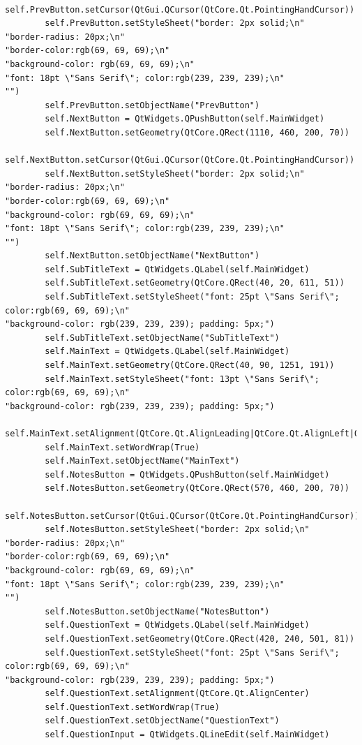 \documentclass{article}
\begin{document}
\begin{lstlisting}
        self.PrevButton.setCursor(QtGui.QCursor(QtCore.Qt.PointingHandCursor))
        self.PrevButton.setStyleSheet("border: 2px solid;\n"
"border-radius: 20px;\n"
"border-color:rgb(69, 69, 69);\n"
"background-color: rgb(69, 69, 69);\n"
"font: 18pt \"Sans Serif\"; color:rgb(239, 239, 239);\n"
"")
        self.PrevButton.setObjectName("PrevButton")
        self.NextButton = QtWidgets.QPushButton(self.MainWidget)
        self.NextButton.setGeometry(QtCore.QRect(1110, 460, 200, 70))
        self.NextButton.setCursor(QtGui.QCursor(QtCore.Qt.PointingHandCursor))
        self.NextButton.setStyleSheet("border: 2px solid;\n"
"border-radius: 20px;\n"
"border-color:rgb(69, 69, 69);\n"
"background-color: rgb(69, 69, 69);\n"
"font: 18pt \"Sans Serif\"; color:rgb(239, 239, 239);\n"
"")
        self.NextButton.setObjectName("NextButton")
        self.SubTitleText = QtWidgets.QLabel(self.MainWidget)
        self.SubTitleText.setGeometry(QtCore.QRect(40, 20, 611, 51))
        self.SubTitleText.setStyleSheet("font: 25pt \"Sans Serif\"; color:rgb(69, 69, 69);\n"
"background-color: rgb(239, 239, 239); padding: 5px;")
        self.SubTitleText.setObjectName("SubTitleText")
        self.MainText = QtWidgets.QLabel(self.MainWidget)
        self.MainText.setGeometry(QtCore.QRect(40, 90, 1251, 191))
        self.MainText.setStyleSheet("font: 13pt \"Sans Serif\"; color:rgb(69, 69, 69);\n"
"background-color: rgb(239, 239, 239); padding: 5px;")
        self.MainText.setAlignment(QtCore.Qt.AlignLeading|QtCore.Qt.AlignLeft|QtCore.Qt.AlignTop)
        self.MainText.setWordWrap(True)
        self.MainText.setObjectName("MainText")
        self.NotesButton = QtWidgets.QPushButton(self.MainWidget)
        self.NotesButton.setGeometry(QtCore.QRect(570, 460, 200, 70))
        self.NotesButton.setCursor(QtGui.QCursor(QtCore.Qt.PointingHandCursor))
        self.NotesButton.setStyleSheet("border: 2px solid;\n"
"border-radius: 20px;\n"
"border-color:rgb(69, 69, 69);\n"
"background-color: rgb(69, 69, 69);\n"
"font: 18pt \"Sans Serif\"; color:rgb(239, 239, 239);\n"
"")
        self.NotesButton.setObjectName("NotesButton")
        self.QuestionText = QtWidgets.QLabel(self.MainWidget)
        self.QuestionText.setGeometry(QtCore.QRect(420, 240, 501, 81))
        self.QuestionText.setStyleSheet("font: 25pt \"Sans Serif\"; color:rgb(69, 69, 69);\n"
"background-color: rgb(239, 239, 239); padding: 5px;")
        self.QuestionText.setAlignment(QtCore.Qt.AlignCenter)
        self.QuestionText.setWordWrap(True)
        self.QuestionText.setObjectName("QuestionText")
        self.QuestionInput = QtWidgets.QLineEdit(self.MainWidget)

\end{lstlisting}
\end{document}
